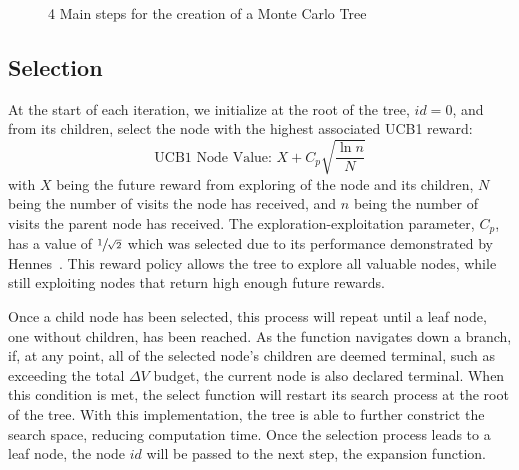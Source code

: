 \documentclass[letterpaper, preprint, paper,11pt]{AAS}	%
\newcommand*\circled[1]{\tikz[baseline=(char.base)]{
            \node[shape=circle,draw,inner sep=0.8pt] (char) {#1};}}
\begin{document}
\begin{figure}[htb]
    \centering
    \caption{4 Main steps for the creation of a Monte Carlo Tree}
    \label{fig:mctsFunc}
\end{figure}

\subsection{Selection}
At the start of each iteration, we initialize at the root of the tree, $id = 0$, and from its children, select the node with the highest associated UCB1 reward:
\begin{equation}
    \label{eq:UCB1}
    \text{UCB1 Node Value: } X + C_p \sqrt{\frac{\ln{n}}{N}}
\end{equation}
\clearpage \noindent with $X$ being the future reward from exploring of the node and its children, $N$ being the number of visits the node has received, and $n$ being the number of visits the parent node has received. The exploration-exploitation parameter, $C_p$, has a value of \(\sfrac{1}{\sqrt{2}}\) which was selected due to its performance demonstrated by Hennes~\cite{Hennes2015}. This reward policy allows the tree to explore all valuable nodes, while still exploiting nodes that return high enough future rewards.

Once a child node has been selected, this process will repeat until a leaf node, one without children, has been reached. As the function navigates down a branch, if, at any point, all of the selected node's children are deemed terminal, such as exceeding the total $\Delta V$ budget, the current node is also declared terminal. When this condition is met, the select function will restart its search process at the root of the tree. With this implementation, the tree is able to further constrict the search space, reducing computation time. Once the selection process leads to a leaf node, the node $id$ will be passed to the next step, the expansion function.
\end{document}
